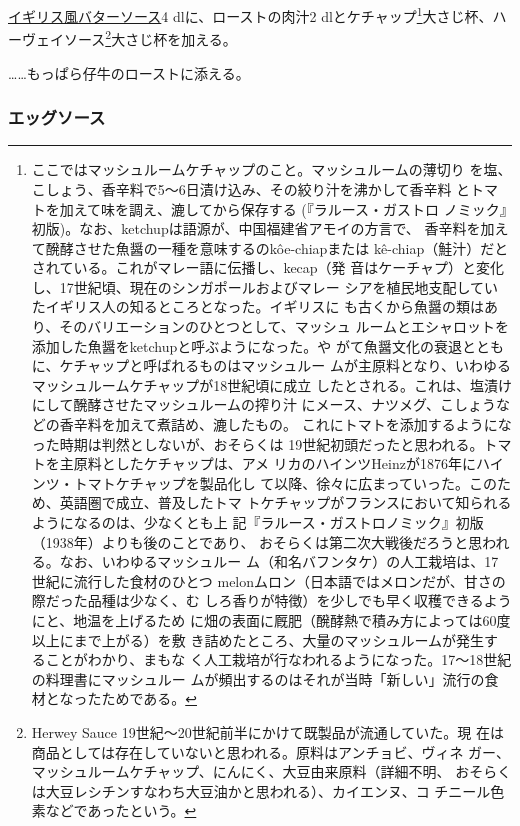 \begin{recette}
\protect\hyperlink{butter-sauce}{イギリス風バターソース}4
dlに、ローストの肉汁2 dlとケチャップ\footnote{ここではマッシュルームケチャップのこと。マッシュルームの薄切り
  を塩、こしょう、香辛料で5〜6日漬け込み、その絞り汁を沸かして香辛料
  とトマトを加えて味を調え、漉してから保存する (『ラルース・ガストロ
  ノミック』初版)。なお、ketchupは語源が、中国福建省アモイの方言で、
  香辛料を加えて醗酵させた魚醤の一種を意味するのkôe-chiapまたは
  kê-chiap（鮭汁）だとされている。これがマレー語に伝播し、kecap（発
  音はケーチャプ）と変化し、17世紀頃、現在のシンガポールおよびマレー
  シアを植民地支配していたイギリス人の知るところとなった。イギリスに
  も古くから魚醤の類はあり、そのバリエーションのひとつとして、マッシュ
  ルームとエシャロットを添加した魚醤をketchupと呼ぶようになった。や
  がて魚醤文化の衰退とともに、ケチャップと呼ばれるものはマッシュルー
  ムが主原料となり、いわゆるマッシュルームケチャップが18世紀頃に成立
  したとされる。これは、塩漬けにして醗酵させたマッシュルームの搾り汁
  にメース、ナツメグ、こしょうなどの香辛料を加えて煮詰め、漉したもの。
  これにトマトを添加するようになった時期は判然としないが、おそらくは
  19世紀初頭だったと思われる。トマトを主原料としたケチャップは、アメ
  リカのハインツHeinzが1876年にハインツ・トマトケチャップを製品化し
  て以降、徐々に広まっていった。このため、英語圏で成立、普及したトマ
  トケチャップがフランスにおいて知られるようになるのは、少なくとも上
  記『ラルース・ガストロノミック』初版（1938年）よりも後のことであり、
  おそらくは第二次大戦後だろうと思われる。なお、いわゆるマッシュルー
  ム（和名バフンタケ）の人工栽培は、17世紀に流行した食材のひとつ
  melonムロン（日本語ではメロンだが、甘さの際だった品種は少なく、む
  しろ香りが特徴）を少しでも早く収穫できるようにと、地温を上げるため
  に畑の表面に厩肥（醗酵熱で積み方によっては60度以上にまで上がる）を敷
  き詰めたところ、大量のマッシュルームが発生することがわかり、まもな
  く人工栽培が行なわれるようになった。17〜18世紀の料理書にマッシュルー
  ムが頻出するのはそれが当時「新しい」流行の食材となったためである。}大さじ\undemi{}杯、ハーヴェイソース\footnote{Herwey
  Sauce 19世紀〜20世紀前半にかけて既製品が流通していた。現
  在は商品としては存在していないと思われる。原料はアンチョビ、ヴィネ
  ガー、マッシュルームケチャップ、にんにく、大豆由来原料（詳細不明、
  おそらくは大豆レシチンすなわち大豆油かと思われる）、カイエンヌ、コ
  チニール色素などであったという。}大さじ\undemi{}杯を加える。

\ldots{}\ldots{}もっぱら仔牛のローストに添える。

\hypertarget{ux30a8ux30c3ux30b0ux30bdux30fcux30b9}{%
\subsubsection{エッグソース}\label{ux30a8ux30c3ux30b0ux30bdux30fcux30b9}}


\end{recette}
